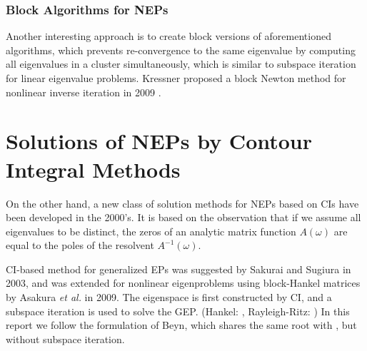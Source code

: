 \documentclass[final,leqno,onefignum,onetabnum]{siamltex1213}
\begin{document}
\subsubsection{Block Algorithms for NEPs}
Another interesting approach is to create block versions of aforementioned algorithms, which prevents re-convergence to the same eigenvalue by computing all eigenvalues in a cluster simultaneously, which is similar to subspace iteration for linear eigenvalue problems. Kressner proposed a block Newton method for nonlinear inverse iteration in 2009 \citep{kressner2009block}. 
\section{Solutions of NEPs by Contour Integral Methods}
On the other hand, a new class of solution methods for NEPs based on CIs have been developed in the 2000's. It is based on the observation that if we assume all eigenvalues to be distinct, the zeros of an analytic matrix function $A(\omega)$ are equal to the poles of the resolvent $A^{-1}(\omega)$. 

CI-based method for generalized EPs was suggested by Sakurai and Sugiura in 2003, \citep{sakurai2003projection} and was extended for nonlinear eigenproblems using block-Hankel matrices by Asakura {\it et al.} in 2009. \citep{asakura_numerical_2009} The eigenspace is first constructed by CI, and a subspace iteration is used to solve the GEP. (Hankel: \citep{asakura_numerical_2009}, Rayleigh-Ritz: \citep{yokota_projection_2013}) In this report we follow the formulation of Beyn\citep{beyn_integral_2012}, which shares the same root with \citep{asakura_numerical_2009, sakurai_efficient_2013}, but without subspace iteration. 

\end{document}
